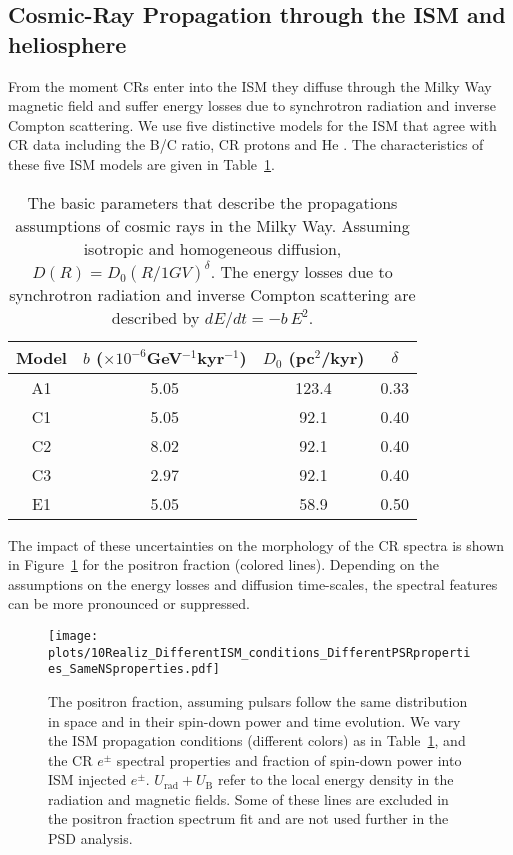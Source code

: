 \documentclass[aps,prd,twocolumn,amsmath,superscriptaddress,amssymb,showpacs,floatfix,nofootinbib]{revtex4-1}
\begin{document}
\begin{appendix}
\section{Cosmic-Ray Propagation through the ISM and heliosphere}
\label{appD}

From the moment CRs enter into the ISM they diffuse through the
Milky Way magnetic field and suffer energy losses due to
synchrotron radiation and inverse Compton scattering. We use
five distinctive models for the ISM that 
agree with CR data including the B/C ratio, CR protons and He
\cite{Cholis:2015gna}. The 
characteristics of these five ISM models are given in Table~\ref{tab:ISMBack}. 
\begin{table}[t]
    \begin{tabular}{cccc}
         \hline
           Model & $b$ ($\times 10^{-6}$GeV$^{-1}$kyr$^{-1}$) & $D_{0}$ (pc$^2$/kyr) & $\delta$\\
            \hline \hline
            A1 &  5.05 & 123.4 & 0.33 \\
            C1 &  5.05 & 92.1 & 0.40 \\
            C2 &  8.02 & 92.1 & 0.40 \\
            C3 &  2.97 & 92.1 & 0.40 \\      
            E1 &  5.05 & 58.9 & 0.50 \\
        \hline \hline 
        \end{tabular}
\caption{The basic parameters that describe the propagations assumptions of cosmic rays in the Milky Way. Assuming isotropic and homogeneous diffusion, $D(R) = D_{0} (R/1 GV)^{\delta}$. The energy losses due to 
synchrotron radiation and inverse Compton scattering are described by $dE/dt = - b \, E^{2}$.} 
\label{tab:ISMBack}
\end{table}

The impact of these uncertainties on the morphology of the CR
spectra is shown in Figure~\ref{fig:ISM_Inj_Prop}
for the positron fraction (colored lines). Depending on the
assumptions on the energy losses and diffusion time-scales, the
spectral features can be more pronounced or suppressed. 
\begin{figure}
\begin{centering}
\hspace{-0.6cm}
\texttt{[image: plots/10Realiz\_DifferentISM\_conditions\_DifferentPSRproperties\_SameNSproperties.pdf]}
\end{centering}
\vspace{-0.5cm}
\caption{The positron fraction, assuming pulsars follow the same distribution in space and in their spin-down power and time evolution. 
We vary the ISM propagation conditions (different colors) as in Table~\ref{tab:ISMBack}, and the CR $e^{\pm}$ spectral properties and fraction
of spin-down power into ISM injected $e^{\pm}$. $U_{\textrm{rad}}+U_{\textrm{B}}$ refer to the local energy density in the radiation and magnetic fields. 
Some of these lines are excluded in the positron fraction spectrum fit and are not used further in the PSD analysis.}
\vspace{-0.4cm}
\label{fig:ISM_Inj_Prop}
\end{figure}


\end{appendix}
\end{document}
